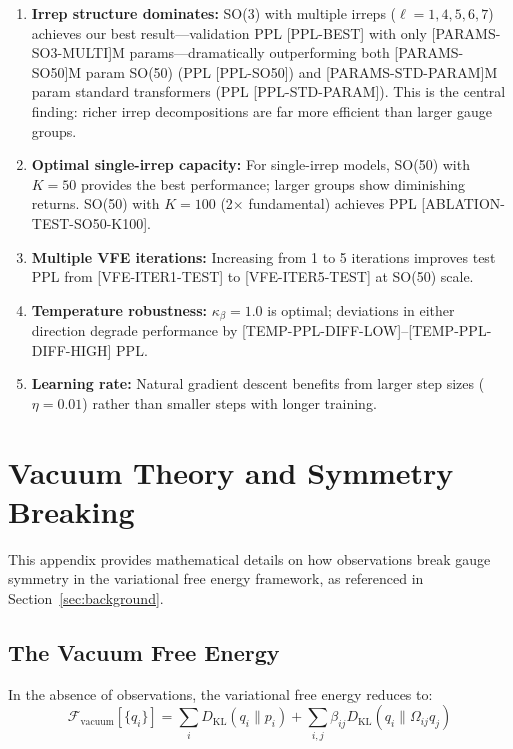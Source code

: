 \documentclass[twoside,11pt]{article}
\begin{document}
\begin{enumerate}
\item \textbf{Irrep structure dominates:} SO(3) with multiple irreps ($\ell=1,4,5,6,7$) achieves our best result---validation PPL [PPL-BEST] with only [PARAMS-SO3-MULTI]M params---dramatically outperforming both [PARAMS-SO50]M param SO(50) (PPL [PPL-SO50]) and [PARAMS-STD-PARAM]M param standard transformers (PPL [PPL-STD-PARAM]). This is the central finding: richer irrep decompositions are far more efficient than larger gauge groups.

\item \textbf{Optimal single-irrep capacity:} For single-irrep models, SO(50) with $K=50$ provides the best performance; larger groups show diminishing returns. SO(50) with $K=100$ (2$\times$ fundamental) achieves PPL [ABLATION-TEST-SO50-K100].

\item \textbf{Multiple VFE iterations:} Increasing from 1 to 5 iterations improves test PPL from [VFE-ITER1-TEST] to [VFE-ITER5-TEST] at SO(50) scale.

\item \textbf{Temperature robustness:} $\kappa_\beta = 1.0$ is optimal; deviations in either direction degrade performance by [TEMP-PPL-DIFF-LOW]--[TEMP-PPL-DIFF-HIGH] PPL.

\item \textbf{Learning rate:} Natural gradient descent benefits from larger step sizes ($\eta = 0.01$) rather than smaller steps with longer training.
\end{enumerate}

\section{Vacuum Theory and Symmetry Breaking}
\label{app:vacuum}

This appendix provides mathematical details on how observations break gauge symmetry in the variational free energy framework, as referenced in Section~\ref{sec:background}.

\subsection{The Vacuum Free Energy}

In the absence of observations, the variational free energy reduces to:
\begin{equation}
\mathcal{F}_{\text{vacuum}}[\{q_i\}] = \sum_i D_{\mathrm{KL}}(q_i \| p_i) + \sum_{i,j} \beta_{ij} D_{\mathrm{KL}}(q_i \| \Omega_{ij} q_j)
\label{eq:vacuum_fe}
\end{equation}
\end{document}
